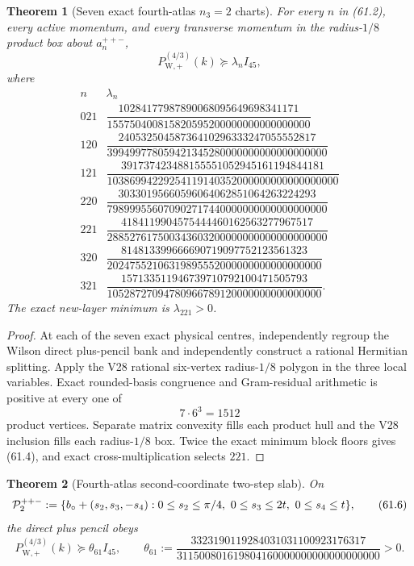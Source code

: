 \documentclass[11pt,oneside]{article}
\newtheorem{theorem}{Theorem}[section]
\theoremstyle{definition}
\theoremstyle{remark}
\begin{document}
\begin{theorem}[Seven exact fourth-atlas \(n_3=2\) charts]
\label{thm:newv61-seven-charts}
For every \(n\) in (61.2), every active momentum, and every
transverse momentum in the radius-\(1/8\) product box about
\(a_n^{++-}\),
\[
 P_{\mathrm W,+}^{(4/3)}(k)\succeq\lambda_nI_{45},   \tag{61.3}
\]
where
\[
\begin{array}{c|c}
n&\lambda_n\\ \hline
021&
\dfrac{10284177987890068095649698341171}
 {155750400815820595200000000000000000}\\[5pt]
120&
\dfrac{24053250458736410296333247055552817}
 {399499778059421345280000000000000000000}\\[5pt]
121&
\dfrac{391737423488155551052945161194844181}
 {10386994229254119140352000000000000000000}\\[5pt]
220&
\dfrac{30330195660596064062851064263224293}
 {798999556070902717440000000000000000000}\\[5pt]
221&
\dfrac{4184119904575444460162563277967517}
 {288527617500343603200000000000000000000}\\[5pt]
320&
\dfrac{814813399666690719097752123561323}
 {20247552106319895552000000000000000000}\\[5pt]
321&
\dfrac{157133511946739710792100471505793}
 {10528727094780966789120000000000000000}.
\end{array}                                           \tag{61.4}
\]
The exact new-layer minimum is \(\lambda_{221}>0\).
\end{theorem}

\begin{proof}
At each of the seven exact physical centres, independently regroup
the Wilson direct plus-pencil bank and independently construct a
rational Hermitian splitting.  Apply the V28 rational six-vertex
radius-\(1/8\) polygon in the three local variables.  Exact
rounded-basis congruence and Gram-residual arithmetic is positive
at every one of
\[
 7\cdot6^3=1512                                       \tag{61.5}
\]
product vertices.  Separate matrix convexity fills each product
hull and the V28 inclusion fills each radius-\(1/8\) box.  Twice
the exact minimum block floors gives (61.4), and exact
cross-multiplication selects \(221\).
\end{proof}

\begin{theorem}[Fourth-atlas second-coordinate two-step slab]
\label{thm:newv61-second-slab}
On
\[
 {\cal P}^{++-}_2:=
 \{b_\circ+(s_2,s_3,-s_4):
 0\le s_2\le\pi/4,\ 0\le s_3\le2t,\ 0\le s_4\le t\}, \tag{61.6}
\]
the direct plus pencil obeys
\[
 P_{\mathrm W,+}^{(4/3)}(k)
 \succeq\theta_{61}I_{45},\qquad
 \theta_{61}:=
 \frac{3323190119284031031100923176317}
 {311500801619804160000000000000000000}>0.            \tag{61.7}
\]
\end{theorem}
\end{document}
